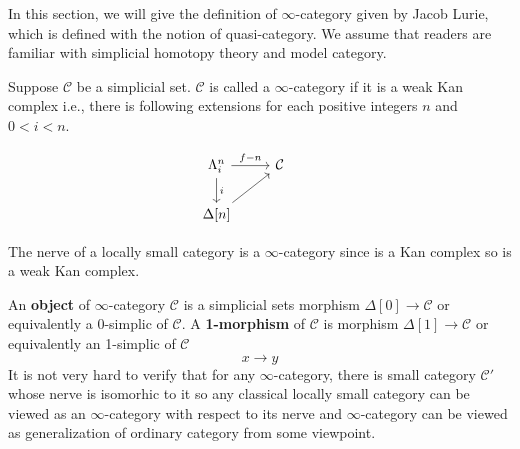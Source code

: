 In this section, we will give the definition of $\infty$-category given by Jacob Lurie, which is defined with the notion of quasi-category. We assume that readers are familiar with simplicial homotopy theory and model category.
\begin{mydefn}
Suppose $\mathcal{C}$ be a simplicial set. $\mathcal{C}$ is called a $\infty$-category if it is a weak Kan complex i.e., there is following extensions for each positive integers $n$ and $0<i<n$.

\[
\begin{tikzcd}
\Lambda^{n}_{i} \ar[r,"f-n"] \ar[d,"i"]& \mathcal{C}&\\
\Delta[n] \ar[ru]&  &
\end{tikzcd}
\]
\end{mydefn}

\begin{ex}
  The nerve of a locally small category is a $\infty$-category since is a Kan complex so is a weak Kan complex.
\end{ex}
An \textbf{object} of $\infty$-category $\mathcal{C}$ is a simplicial sets morphism $\Delta[0] \rightarrow \mathcal{C}$ or equivalently a 0-simplic of $\mathcal{C}$. A \textbf{1-morphism} of $\mathcal{C}$ is morphism $\Delta[1] \rightarrow \mathcal{C}$ or equivalently an 1-simplic of $\mathcal{C}$
\[
x \rightarrow y
\]
It is not very hard to verify that for any $\infty$-category, there is small category $\mathcal{C}'$ whose nerve is isomorhic to it \citep[see][]{Luri2009} so any classical locally small category can be viewed as an $\infty$-category with respect to its nerve and $\infty$-category can be viewed as generalization of ordinary category from some viewpoint.

